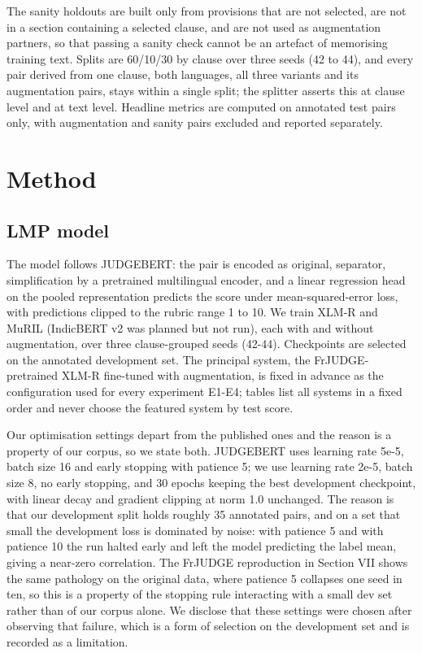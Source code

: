 \documentclass[conference]{IEEEtran}
\begin{document}
The sanity holdouts are built only from provisions that are not selected, are not in a section containing a selected clause, and are not used as augmentation partners, so that passing a sanity check cannot be an artefact of memorising training text. Splits are 60/10/30 by clause over three seeds (42 to 44), and every pair derived from one clause, both languages, all three variants and its augmentation pairs, stays within a single split; the splitter asserts this at clause level and at text level. Headline metrics are computed on annotated test pairs only, with augmentation and sanity pairs excluded and reported separately.

\section{Method}

\subsection{LMP model}

The model follows JUDGEBERT: the pair is encoded as original, separator, simplification by a pretrained multilingual encoder, and a linear regression head on the pooled representation predicts the score under mean-squared-error loss, with predictions clipped to the rubric range 1 to 10. We train XLM-R and MuRIL (IndicBERT v2 was planned but not run), each with and without augmentation, over three clause-grouped seeds (42-44). Checkpoints are selected on the annotated development set. The principal system, the FrJUDGE-pretrained XLM-R fine-tuned with augmentation, is fixed in advance as the configuration used for every experiment E1-E4; tables list all systems in a fixed order and never choose the featured system by test score.

Our optimisation settings depart from the published ones and the reason is a property of our corpus, so we state both. JUDGEBERT uses learning rate 5e-5, batch size 16 and early stopping with patience 5; we use learning rate 2e-5, batch size 8, no early stopping, and 30 epochs keeping the best development checkpoint, with linear decay and gradient clipping at norm 1.0 unchanged. The reason is that our development split holds roughly 35 annotated pairs, and on a set that small the development loss is dominated by noise: with patience 5 and with patience 10 the run halted early and left the model predicting the label mean, giving a near-zero correlation. The FrJUDGE reproduction in Section VII shows the same pathology on the original data, where patience 5 collapses one seed in ten, so this is a property of the stopping rule interacting with a small dev set rather than of our corpus alone. We disclose that these settings were chosen after observing that failure, which is a form of selection on the development set and is recorded as a limitation.
\end{document}
